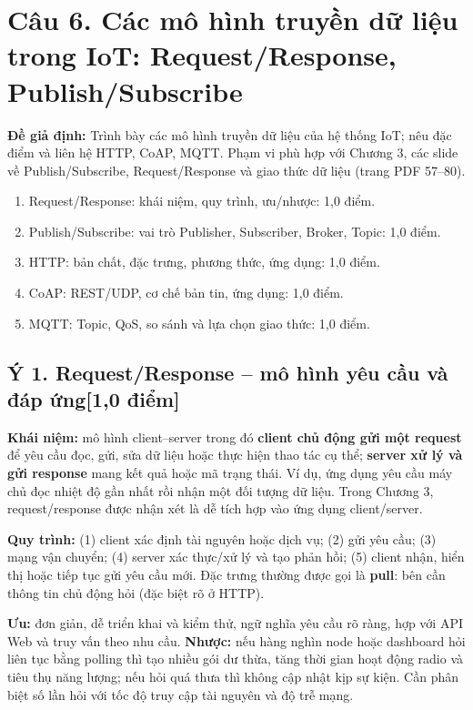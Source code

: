 \documentclass[12pt,a4paper]{article}
\newcommand{\muc}[1]{\subsection*{#1\hfill{\color{teal}\normalsize [1,0 điểm]}}}
\begin{document}
\newpage
\section{Câu 6. Các mô hình truyền dữ liệu trong IoT: Request/Response, Publish/Subscribe}
\textbf{Đề giả định:} Trình bày các mô hình truyền dữ liệu của hệ thống IoT; nêu đặc điểm và liên hệ HTTP, CoAP, MQTT. Phạm vi phù hợp với Chương 3, các slide về Publish/Subscribe, Request/Response và giao thức dữ liệu (trang PDF 57--80).

\begin{barem}
\begin{enumerate}
\item Request/Response: khái niệm, quy trình, ưu/nhược: 1,0 điểm.
\item Publish/Subscribe: vai trò Publisher, Subscriber, Broker, Topic: 1,0 điểm.
\item HTTP: bản chất, đặc trưng, phương thức, ứng dụng: 1,0 điểm.
\item CoAP: REST/UDP, cơ chế bản tin, ứng dụng: 1,0 điểm.
\item MQTT: Topic, QoS, so sánh và lựa chọn giao thức: 1,0 điểm.
\end{enumerate}
\end{barem}

\muc{Ý 1. Request/Response -- mô hình yêu cầu và đáp ứng}
\textbf{Khái niệm:} mô hình client--server trong đó \textbf{client chủ động gửi một request} để yêu cầu đọc, gửi, sửa dữ liệu hoặc thực hiện thao tác cụ thể; \textbf{server xử lý và gửi response} mang kết quả hoặc mã trạng thái. Ví dụ, ứng dụng yêu cầu máy chủ đọc nhiệt độ gần nhất rồi nhận một đối tượng dữ liệu. Trong Chương 3, request/response được nhận xét là dễ tích hợp vào ứng dụng client/server.

\textbf{Quy trình:} (1) client xác định tài nguyên hoặc dịch vụ; (2) gửi yêu cầu; (3) mạng vận chuyển; (4) server xác thực/xử lý và tạo phản hồi; (5) client nhận, hiển thị hoặc tiếp tục gửi yêu cầu mới. Đặc trưng thường được gọi là \textbf{pull}: bên cần thông tin chủ động hỏi (đặc biệt rõ ở HTTP).

\textbf{Ưu:} đơn giản, dễ triển khai và kiểm thử, ngữ nghĩa yêu cầu rõ ràng, hợp với API Web và truy vấn theo nhu cầu. \textbf{Nhược:} nếu hàng nghìn node hoặc dashboard hỏi liên tục bằng polling thì tạo nhiều gói dư thừa, tăng thời gian hoạt động radio và tiêu thụ năng lượng; nếu hỏi quá thưa thì không cập nhật kịp sự kiện. Cần phân biệt số lần hỏi với tốc độ truy cập tài nguyên và độ trễ mạng.
\end{document}

